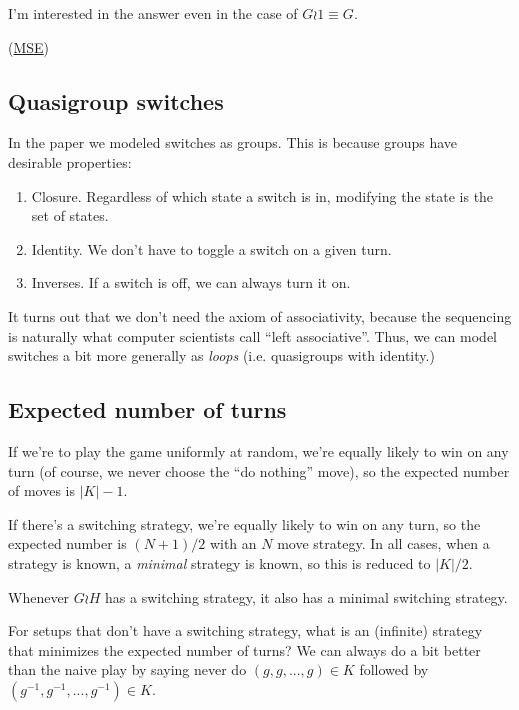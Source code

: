 I'm interested in the answer even in the case of $G \wr \mathrm{1} \equiv G$.

(\href{https://math.stackexchange.com/q/3706654/121988}{MSE})

\subsection{Quasigroup switches}
\label{sub:quasigroupSwitches}
In the paper we modeled switches as groups.
This is because groups have desirable properties: \begin{enumerate}
  \item Closure. Regardless of which state a switch is in, modifying the state is the set of states.
  \item Identity. We don't have to toggle a switch on a given turn.
  \item Inverses. If a switch is off, we can always turn it on.
\end{enumerate}

It turns out that we don't need the axiom of associativity,
because the sequencing is naturally what computer scientists call
``left associative''. Thus, we can model switches a bit more generally as
\textit{loops} (i.e. quasigroups with identity.)

\subsection{Expected number of turns}
If we're to play the game uniformly at random, we're equally likely to win on
any turn (of course, we never choose the ``do nothing'' move), so the expected
number of moves is $|K| - 1$.

If there's a switching strategy, we're equally likely to win on any turn, so
the expected number is $(N+1)/2$ with an $N$ move strategy. In all cases,
when a strategy is known, a \textit{minimal} strategy is known, so this is
reduced to $|K|/2$.

\begin{conjecture}
  Whenever $G \wr H$ has a switching strategy, it also has a minimal switching
  strategy.
\end{conjecture}

For setups that don't have a switching strategy, what is an (infinite) strategy
that minimizes the expected number of turns?
We can always do a bit better than the naive play by saying never do
$(g,g, ..., g) \in K$ followed by $(g^{-1},g^{-1}, ..., g^{-1}) \in K$.

